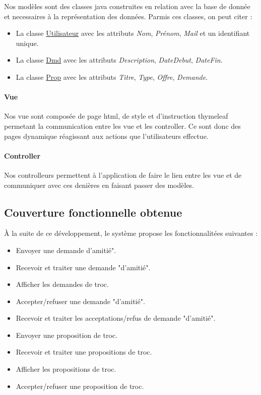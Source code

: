 \documentclass{article}
\begin{document}
Nos modèles sont des classes java construites en relation avec la base de donnée et necessaires à la représentation des données. Parmis ces classes, on peut citer :
\begin{itemize}
  \item La classe \underline{Utilisateur} avec les attributs \textit{Nom}, \textit{Prénom}, \textit{Mail} et un identifiant unique.
  \item La classe \underline{Dmd} avec les attributs \textit{Description}, \textit{DateDebut}, \textit{DateFin}.
  \item La classe \underline{Prop} avec les attributs \textit{Titre}, \textit{Type}, \textit{Offre}, \textit{Demande}.
\end{itemize}

\paragraph{Vue}
Nos vue sont composée de page html, de style et d'instruction thymeleaf permetant la communication entre les vue et les controller. Ce sont donc des pages dynamique réagissant aux actions que l'utilisateurs effectue.

\paragraph{Controller}
Nos controlleurs permettent à l'application de faire le lien entre les vue et de communiquer avec ces denières en faisant passer des modèles.


\subsection{Couverture fonctionnelle obtenue}
À la suite de ce développement, le système propose les fonctionnalitées suivantes :
\begin{itemize}
  \item Envoyer une demande d'amitié".
  \item Recevoir et traiter une demande "d'amitié".
  \item Afficher les demandes de troc.
  \item Accepter/refuser une demande "d'amitié".
  \item Recevoir et traiter les acceptations/refus de demande "d'amitié".
  \item Envoyer une proposition de troc.
  \item Recevoir et traiter une propositions de troc.
  \item Afficher les propositions de troc.
  \item Accepter/refuser une proposition de troc.
\end{itemize}
\end{document}
